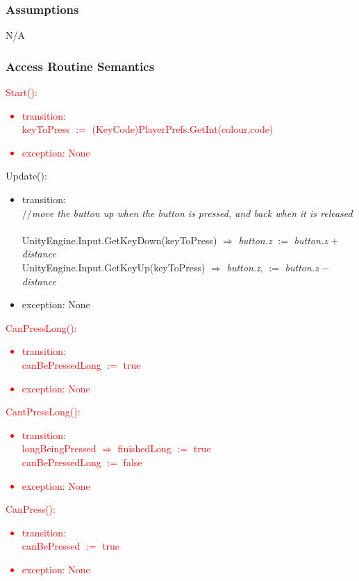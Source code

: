 \documentclass[12pt]{article}
\begin{document}
\subsubsection {Assumptions}
N/A
\subsubsection {Access Routine Semantics}

\textcolor{red}{\noindent Start():
\begin{itemize}
	\item transition: \\
	keyToPress $:=$ (KeyCode)PlayerPrefs.GetInt(colour,code)
	\item exception: None
\end{itemize}}

\noindent Update():
\begin{itemize}
	\item transition: \\
	//\textit{move the button up when the button is pressed, and back when it is released}\\\\
	UnityEngine.Input.GetKeyDown(keyToPress) $\Rightarrow$ \textit{button.z} $:=$ \textit{button.z} $+$ \textit{distance}\\
	UnityEngine.Input.GetKeyUp(keyToPress) $\Rightarrow$ \textit{button.z}, $:=$ \textit{button.z} $-$ \textit{distance}
	\item exception: None
\end{itemize}

\noindent\textcolor{red}{CanPressLong():
\begin{itemize}
	\item transition: \\
	canBePressedLong $:=$ true
	\item exception: None
\end{itemize}}

\noindent\textcolor{red}{CantPressLong():
\begin{itemize}
	\item transition: \\
	longBeingPressed $\Rightarrow$ finishedLong $:=$ true\\
	canBePressedLong $:=$ false
	\item exception: None
\end{itemize}}

\noindent\textcolor{red}{CanPress():
\begin{itemize}
	\item transition: \\
	canBePressed $:=$ true
	\item exception: None
\end{itemize}}
\end{document}
